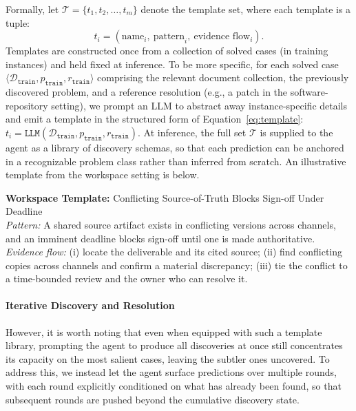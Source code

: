 \documentclass{llmxive}
\begin{document}
Formally, let $\mathcal{T} = \{t_1, t_2, \dots, t_m\}$ denote the template set, where each template is a tuple:
\begin{equation}
t_i = (\text{name}_i,\ \text{pattern}_i,\ \text{evidence flow}_i).
\label{eq:template}
\end{equation}
Templates are constructed once from a collection of solved cases (in training instances) and held fixed at inference. To be more specific, for each solved case $\langle \mathcal{D}_{\texttt{train}}, p_{\texttt{train}}, r_{\texttt{train}} \rangle$ comprising the relevant document collection, the previously discovered problem, and a reference resolution (e.g., a patch in the software-repository setting), we prompt an LLM to abstract away instance-specific details and emit a template in the structured form of Equation~\ref{eq:template}:
$
t_i = \texttt{LLM}(\mathcal{D}_{\texttt{train}}, p_{\texttt{train}}, r_{\texttt{train}}).
$
At inference, the full set $\mathcal{T}$ is supplied to the agent as a library of discovery schemas, so that each prediction can be anchored in a recognizable problem class rather than inferred from scratch. An illustrative template from the workspace setting is below.

\begin{tcolorbox}[colback=gray!5, colframe=gray!50, boxrule=0.5pt, arc=2mm, left=4pt, right=4pt, top=3pt, bottom=3pt]
\noindent\textbf{Workspace Template:} Conflicting Source-of-Truth Blocks Sign-off Under Deadline\\[2pt]
\emph{Pattern:} A shared source artifact exists in conflicting versions across channels, and an imminent deadline blocks sign-off until one is made authoritative.\\
\emph{Evidence flow:} (i) locate the deliverable and its cited source; (ii) find conflicting copies across channels and confirm a material discrepancy; (iii) tie the conflict to a time-bounded review and the owner who can resolve it.
\end{tcolorbox}

\paragraph{Iterative Discovery and Resolution}
However, it is worth noting that even when equipped with such a template library, prompting the agent to produce all discoveries at once still concentrates its capacity on the most salient cases, leaving the subtler ones uncovered. To address this, we instead let the agent surface predictions over multiple rounds, with each round explicitly conditioned on what has already been found, so that subsequent rounds are pushed beyond the cumulative discovery state.
\end{document}
